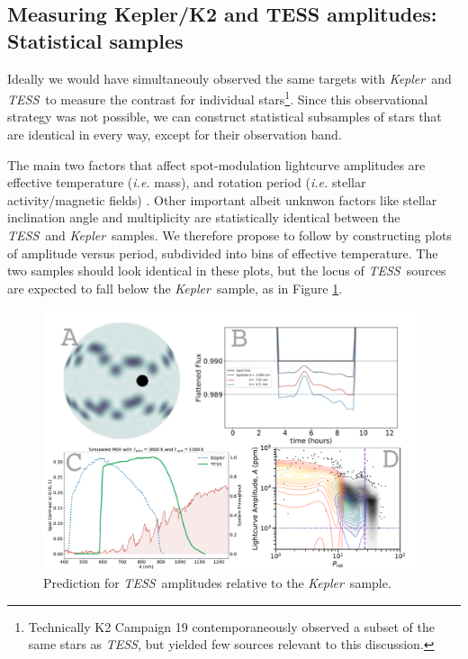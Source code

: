 \documentclass[letterpaper,11pt]{article}
\newcommand{\tess}{{\it TESS}}
\newcommand{\kepler}{{\it Kepler}}
\begin{document}
\subsection{Measuring Kepler/K2 and TESS amplitudes: Statistical samples}
Ideally we would have simultaneouly observed the same targets with \kepler\ and \tess\ to measure the contrast for individual stars\footnote{Technically K2 Campaign 19 contemporaneously observed a subset of the same stars as \tess, but yielded few sources relevant to this discussion.}.  Since this observational strategy was not possible, we can construct statistical subsamples of stars that are identical in every way, except for their observation band.

The main two factors that affect spot-modulation lightcurve amplitudes are effective temperature (\emph{i.e.} mass), and rotation period (\emph{i.e.} stellar activity/magnetic fields) \citep{2014ApJS..211...24M}.  Other important albeit unknwon factors like stellar inclination angle and multiplicity are statistically identical between the \tess\ and \kepler\ samples.  We therefore propose to follow \citet{2014ApJS..211...24M} by constructing plots of amplitude versus period, subdivided into bins of effective temperature.  The two samples should look identical in these plots, but the locus of \tess\ sources are expected to fall below the \kepler\ sample, as in Figure \ref{fig:predictAmps}.

\begin{figure}
\includegraphics[width=0.98\textwidth]{figures/multi_panel.pdf}
\caption{Prediction for \tess\ amplitudes relative to the \kepler\ sample.}
\label{fig:predictAmps}
\end{figure}
\end{document}

